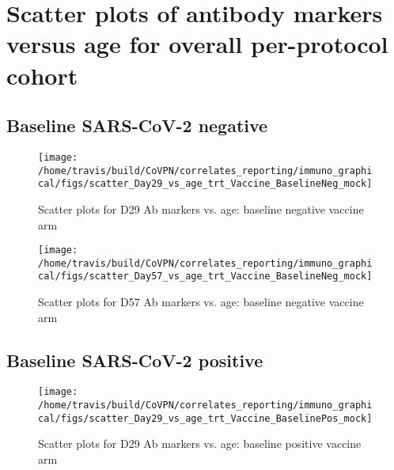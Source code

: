 \documentclass[]{book}
\theoremstyle{definition}
\theoremstyle{definition}
\theoremstyle{definition}
\newcommand{\1}{\mathbbm{1}}
\begin{document}
\hypertarget{scatter-plots-of-antibody-markers-versus-age-for-overall-per-protocol-cohort}{%
\section{Scatter plots of antibody markers versus age for overall per-protocol cohort}\label{scatter-plots-of-antibody-markers-versus-age-for-overall-per-protocol-cohort}}

\hypertarget{baseline-sars-cov-2-negative-1}{%
\subsection{Baseline SARS-CoV-2 negative}\label{baseline-sars-cov-2-negative-1}}

\begin{figure}[H]

{\centering \texttt{[image: /home/travis/build/CoVPN/correlates\_reporting/immuno\_graphical/figs/scatter\_Day29\_vs\_age\_trt\_Vaccine\_BaselineNeg\_mock]} 

}

\caption{Scatter plots for D29 Ab markers vs. age: baseline negative vaccine arm}\label{fig:unnamed-chunk-33}
\end{figure}

\begin{figure}[H]

{\centering \texttt{[image: /home/travis/build/CoVPN/correlates\_reporting/immuno\_graphical/figs/scatter\_Day57\_vs\_age\_trt\_Vaccine\_BaselineNeg\_mock]} 

}

\caption{Scatter plots for D57 Ab markers vs. age: baseline negative vaccine arm}\label{fig:unnamed-chunk-34}
\end{figure}

\hypertarget{baseline-sars-cov-2-positive-1}{%
\subsection{Baseline SARS-CoV-2 positive}\label{baseline-sars-cov-2-positive-1}}

\begin{figure}[H]

{\centering \texttt{[image: /home/travis/build/CoVPN/correlates\_reporting/immuno\_graphical/figs/scatter\_Day29\_vs\_age\_trt\_Vaccine\_BaselinePos\_mock]} 

}

\caption{Scatter plots for D29 Ab markers vs. age: baseline positive vaccine arm}\label{fig:unnamed-chunk-35}
\end{figure}
\end{document}
